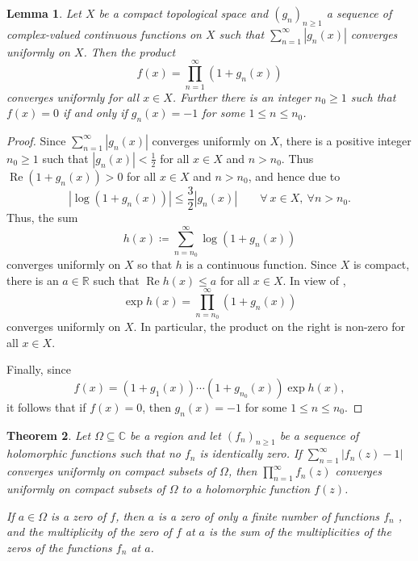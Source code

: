 \documentclass[11pt]{article}
\theoremstyle{thmstyle}
\newtheorem{theorem}{Theorem}[section]
\newtheorem{lemma}[theorem]{Lemma}
\theoremstyle{defstyle}
\newcommand{\R}{\mathbb{R}}
\newcommand{\bbC}{\mathbb{C}}
\renewcommand{\le}{\leqslant}
\renewcommand{\ge}{\geqslant}
\renewcommand{\Re}{\operatorname{Re}}
\begin{document}
\begin{lemma}
    Let $X$ be a compact topological space and $(g_n)_{n\ge 1}$ a sequence of complex-valued continuous functions on $X$ such that $\displaystyle\sum_{n = 1}^\infty |g_n(x)|$ converges uniformly on $X$. Then the product 
    \begin{equation*}
        f(x) = \prod_{n = 1}^\infty\left(1 + g_n(x)\right)
    \end{equation*}
    converges uniformly for all $x\in X$. Further there is an integer $n_0\ge 1$ such that $f(x) = 0$ if and only if $g_n(x) = -1$ for some $1\le n\le n_0$.
\end{lemma}
\begin{proof}
    Since $\displaystyle\sum_{n = 1}^\infty |g_n(x)|$ converges uniformly on $X$, there is a positive integer $n_0\ge 1$ such that $|g_n(x)| < \frac{1}{2}$ for all $x\in X$ and $n > n_0$. Thus $\Re\left(1 + g_n(x)\right) > 0$ for all $x\in X$ and $n > n_0$, and hence due to 
    \begin{equation*}
        \left|\log\left(1 + g_n(x)\right)\right|\le\frac{3}{2}|g_n(x)|\qquad\forall~x\in X,~\forall n > n_0.
    \end{equation*}
    Thus, the sum 
    \begin{equation*}
        h(x)\coloneq\sum_{n = n_0}^\infty \log(1 + g_n(x))
    \end{equation*}
    converges uniformly on $X$ so that $h$ is a continuous function. Since $X$ is compact, there is an $a\in\R$ such that $\Re h(x)\le a$ for all $x\in X$. In view of , 
    \begin{equation*}
        \exp h(x) = \prod_{n = n_0}^\infty \left(1 + g_n(x)\right)
    \end{equation*}
    converges uniformly on $X$. In particular, the product on the right is non-zero for all $x\in X$.

    Finally, since 
    \begin{equation*}
        f(x) = (1 + g_1(x))\cdots(1 + g_{n_0}(x))\exp h(x),
    \end{equation*}
    it follows that if $f(x) = 0$, then $g_n(x) = -1$ for some $1\le n\le n_0$.
\end{proof}

\begin{theorem}
    Let $\Omega\subseteq\bbC$ be a region and let $(f_n)_{n\ge 1}$ be a sequence of holomorphic functions such that no $f_n$ is identically zero. If $\displaystyle\sum_{n = 1}^\infty |f_n(z) - 1|$ converges uniformly on compact subsets of $\Omega$, then $\displaystyle\prod_{n = 1}^\infty f_n(z)$ converges uniformly on compact subsets of $\Omega$ to a holomorphic function $f(z)$.

    If $a\in\Omega$ is a zero of $f$, then $a$ is a zero of only a finite number of functions $f_n$ , and the multiplicity of the zero of $f$ at $a$ is the sum of the multiplicities of the zeros of the functions $f_n$ at $a$.
\end{theorem}
\end{document}
